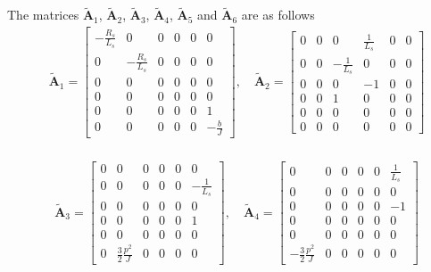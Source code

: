 \documentclass[11pt,a4paper,oneside]{book}
\numberwithin{equation}{section}
\theoremstyle{it}
\theoremstyle{definition}
\begin{document}
The matrices $\tilde{\mathbf{A}}_1$, $\tilde{\mathbf{A}}_2$, 
$\tilde{\mathbf{A}}_3$, $\tilde{\mathbf{A}}_4$, $\tilde{\mathbf{A}}_5$ and $\tilde{\mathbf{A}}_6$ are as follows
\begin{equation}\label{}
	\begin{aligned}
		&\tilde{\mathbf{A}}_1 = 
		\begin{bmatrix} 
			-\frac{R_s}{L_s} & 0 & 0 & 0 & 0 & 0 \\[6pt]			
			0 & -\frac{R_s}{L_s} & 0 & 0 & 0 & 0 \\[6pt]
			0 & 0 & 0 & 0 & 0 & 0 \\[6pt]
			0 & 0 & 0 & 0 & 0 & 0 \\[6pt]
			0 & 0 & 0 & 0 & 0 & 1 \\[6pt]
			0 & 0 & 0 & 0 & 0 & -\frac{b}{J}
		\end{bmatrix},\quad
		\tilde{\mathbf{A}}_2 = 
		\begin{bmatrix} 
			0 & 0 & 0 & \frac{1}{L_s} & 0 & 0 \\[6pt]			
			0 & 0 & -\frac{1}{L_s} & 0 & 0 & 0 \\[6pt]
			0 & 0 & 0 & -1 & 0 & 0 \\[6pt]
			0 & 0 & 1 & 0 & 0 & 0 \\[6pt]
			0 & 0 & 0 & 0 & 0 & 0 \\[6pt]
			0 & 0 & 0 & 0 & 0 & 0
		\end{bmatrix} \\[8pt]
	\end{aligned}
\end{equation}

\begin{equation}
	\begin{aligned}
		&\tilde{\mathbf{A}}_3 = 
		\begin{bmatrix} 
			0 & 0 & 0 & 0 & 0 & 0 \\[6pt]			
			0 & 0 & 0 & 0 & 0 & -\frac{1}{L_s} \\[6pt]
			0 & 0 & 0 & 0 & 0 & 0 \\[6pt]
			0 & 0 & 0 & 0 & 0 & 1 \\[6pt]
			0 & 0 & 0 & 0 & 0 & 0 \\[6pt]
			0 & \frac{3}{2}\frac{p^2}{J} & 0 & 0 & 0 & 0
		\end{bmatrix},\quad
		\tilde{\mathbf{A}}_4 = 
		\begin{bmatrix} 
			0 & 0 & 0 & 0 & 0 & \frac{1}{L_s} \\[6pt]			
			0 & 0 & 0 & 0 & 0 & 0 \\[6pt]
			0 & 0 & 0 & 0 & 0 & -1 \\[6pt]
			0 & 0 & 0 & 0 & 0 & 0 \\[6pt]
			0 & 0 & 0 & 0 & 0 & 0 \\[6pt]
			-\frac{3}{2}\frac{p^2}{J} & 0 & 0 & 0 & 0 & 0
		\end{bmatrix} 
	\end{aligned}
\end{equation} 
\end{document}
